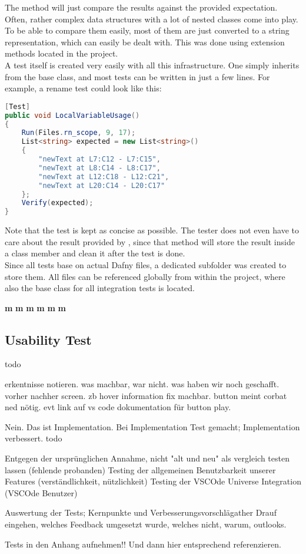 The  method will just compare the results against the provided expectation.
Often, rather complex data structures with a lot of nested classes come into play.
To be able to compare them easily, most of them are just converted to a string representation, which can easily be dealt with.
This was done using extension methods located in the  project.\\

A test itself is created very easily with all this infrastructure.
One simply inherits from the base class, and most tests can be written in just a few lines.
For example, a rename test could look like this:

\begin{lstlisting}[language=csharp, caption={Sample Integration Test}, captionpos=b, label={lst:sampleintegrationtest}]
[Test]
public void LocalVariableUsage()
{
    Run(Files.rn_scope, 9, 17);
    List<string> expected = new List<string>()
    {
        "newText at L7:C12 - L7:C15",
        "newText at L8:C14 - L8:C17",
        "newText at L12:C18 - L12:C21",
        "newText at L20:C14 - L20:C17"
    };
    Verify(expected);
}
\end{lstlisting}

Note that the test is kept as concise as possible.
The tester does not even have to care about the result provided by , since that method will store the result inside a class member and clean it after the test is done.\\

Since all tests base on actual Dafny files, a dedicated subfolder was created to store them.
All files can be referenced globally from within the  project, where also the base class for all integration tests is located.




\textbf{m}
\textbf{m}
\textbf{m}
\textbf{m}
\textbf{m}
\textbf{m}


\subsection{Usability Test}

todo

erkentnisse notieren. was machbar, war nicht. was haben wir noch geschafft. vorher nachher screen.
zb hover information fix machbar. button meint corbat ned nötig. evt link auf vs code dokumentation für button play.


Nein. Das ist Implementation. Bei Implementation Test gemacht; Implementation verbessert.
todo

Entgegen der ursprünglichen Annahme, nicht "alt und neu" als vergleich testen lassen (fehlende probanden)
Testing der allgemeinen Benutzbarkeit unserer Features (verständlichkeit, nützlichkeit)
Testing der VSCOde Universe Integration (VSCOde Benutzer)

Auswertung der Tests; Kernpunkte und Verbesserungsvorschlägather
Drauf eingehen, welches Feedback umgesetzt wurde, welches nicht, warum, outlooks.

Tests in den Anhang aufnehmen!! Und dann hier entsprechend referenzieren.
